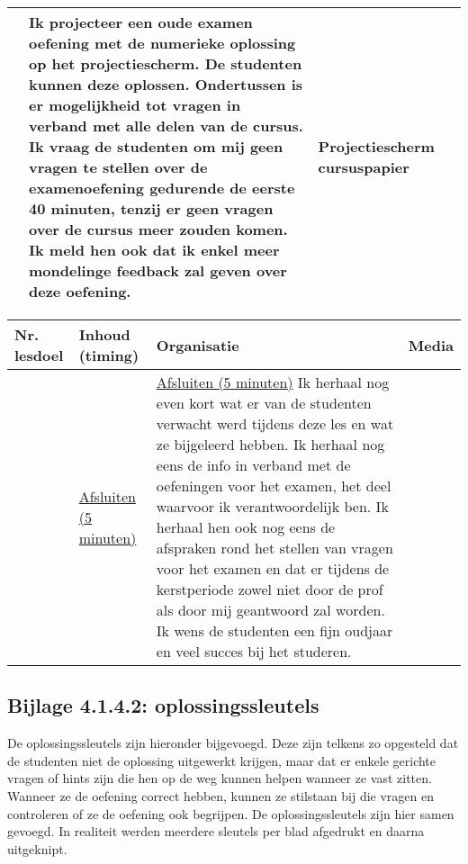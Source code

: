 \begin{landscape}
\begin{tabularx}{1.56\textwidth}{|p{1.5cm}|p{6cm}|X|p{4cm}|}
	&  Ik projecteer een oude examen oefening met de numerieke oplossing op het projectiescherm. De studenten kunnen deze oplossen. Ondertussen is er mogelijkheid tot vragen in verband met alle delen van de cursus. Ik vraag de studenten om mij geen vragen te stellen over de examenoefening gedurende de eerste 40 minuten, tenzij er geen vragen over de cursus meer zouden komen. Ik meld hen ook dat ik enkel meer mondelinge feedback zal geven over deze oefening. 
	& Projectiescherm \newline cursuspapier 
	\\ \hline
\end{tabularx}


	
\begin{tabularx}{1.56\textwidth}{|p{1.5cm}|p{6cm}|X|p{4cm}|}
	\hline
	\textbf{Nr. lesdoel } & \textbf{Inhoud (timing)}  & \textbf{Organisatie } & \textbf{Media } \\ \hline
	&\underline{Afsluiten (5 minuten)}\newline 
	&  \underline{Afsluiten (5 minuten)}\newline
	Ik herhaal nog even kort wat er van de studenten verwacht werd tijdens deze les en wat ze bijgeleerd hebben. Ik herhaal nog eens de info in verband met de oefeningen voor het examen, het deel waarvoor ik verantwoordelijk ben. Ik herhaal hen ook nog eens de afspraken rond het stellen van vragen voor het examen en dat er tijdens de kerstperiode zowel niet door de prof als door mij geantwoord zal worden.  Ik wens de studenten een fijn oudjaar en veel succes bij het studeren.
	& 
	\\ \hline
\end{tabularx}
	
	
	
	
	
	
	
\end{landscape}







\subsection*{Bijlage 4.1.4.2: oplossingssleutels}
De oplossingssleutels zijn hieronder bijgevoegd. Deze zijn telkens zo opgesteld dat de studenten niet de oplossing uitgewerkt krijgen, maar dat er enkele gerichte vragen of hints zijn die hen op de weg kunnen helpen wanneer ze vast zitten. Wanneer ze de oefening correct hebben, kunnen ze stilstaan bij die vragen en controleren of ze de oefening ook begrijpen.\newline
De oplossingssleutels zijn hier samen gevoegd. In realiteit werden meerdere sleutels per blad afgedrukt en daarna uitgeknipt.

